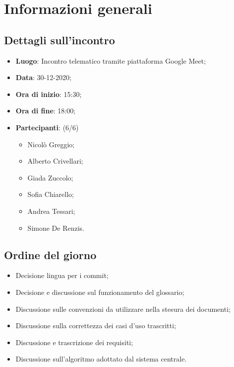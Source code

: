 \section{Informazioni generali}

\subsection{Dettagli sull'incontro}
\begin{itemize}
\item \textbf{Luogo}: Incontro telematico tramite piattaforma Google Meet;
\item \textbf{Data}: 30-12-2020;
\item \textbf{Ora di inizio}: 15:30;
\item \textbf{Ora di fine}: 18:00;
\item \textbf{Partecipanti}: (6/6) 
\begin{itemize}
	\item Nicolò Greggio;
	\item Alberto Crivellari;
	\item Giada Zuccolo;
	\item Sofia Chiarello;
	\item Andrea Tessari;
	\item Simone De Renzis.
\end{itemize}
\end{itemize}

\subsection{Ordine del giorno}
\begin{itemize}
	\item Decisione lingua per i commit;
	\item Decisione e discussione sul funzionamento del glossario;
	\item Discussione sulle convenzioni da utilizzare nella stesura dei documenti;
	\item Discussione sulla correttezza dei casi d'uso trascritti;
	\item Discussione e trascrizione dei requisiti;
	\item Discussione sull'algoritmo adottato dal sistema centrale.

\end{itemize}


